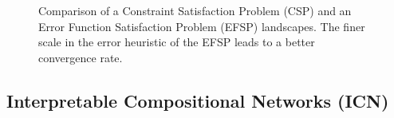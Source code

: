 \documentclass{juliacon}
\newcommand{\efsp}{\textsc{EFSP}\xspace}
\begin{document}
\begin{figure}[t]
  \centering
  \hfill
  \caption{
    Comparison of a Constraint Satisfaction Problem (CSP) and an Error
    Function Satisfaction Problem (\efsp) landscapes. The finer scale
    in the error heuristic of the \efsp leads to a better convergence
    rate.}\label{fig:landscape}
\end{figure}

\subsection{Interpretable Compositional Networks (ICN)}
\label{subsec:icn}
\end{document}
